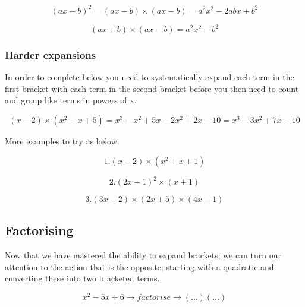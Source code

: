 \begin{equation} 
 \left ( ax - b \right )^{2} = \left ( ax - b \right ) \times \left ( ax - b \right ) = a^{2}x^{2} - 2abx + b^{2}
\end{equation}

\begin{equation} 
 \left ( ax + b \right ) \times \left ( ax - b \right ) = a^{2}x^{2} - b^{2}
\end{equation}

\subsubsection{Harder expansions}

In order to complete below you need to systematically expand each term in the first bracket with each term in the second bracket before you then need to count and group like terms in powers of x.

\begin{equation} 
 \left ( x - 2 \right ) \times \left ( x^{2} - x + 5 \right ) = x^{3} - x^{2} + 5x - 2x^{2} + 2x - 10 = x^{3} - 3x^{2} + 7x - 10
\end{equation}

More examples to try as below:

\begin{equation} 
 1. \left ( x - 2 \right ) \times \left ( x^{2} + x + 1 \right ) 
\end{equation}

\begin{equation} 
 2. \left ( 2x - 1 \right )^{2} \times \left ( x + 1 \right ) 
\end{equation}

\begin{equation} 
 3. \left ( 3x - 2 \right ) \times \left ( 2x + 5 \right ) \times \left ( 4x - 1 \right ) 
\end{equation}

\subsection{Factorising}

Now that we have mastered the ability to expand brackets; we can turn our attention to the action that is the opposite; starting with a quadratic and converting these into two bracketed terms.

\begin{equation} \label{eq:expand}
  x^{2} -5x + 6 \rightarrow factorise \rightarrow \left ( ... \right) \left ( ... \right )
\end{equation}

